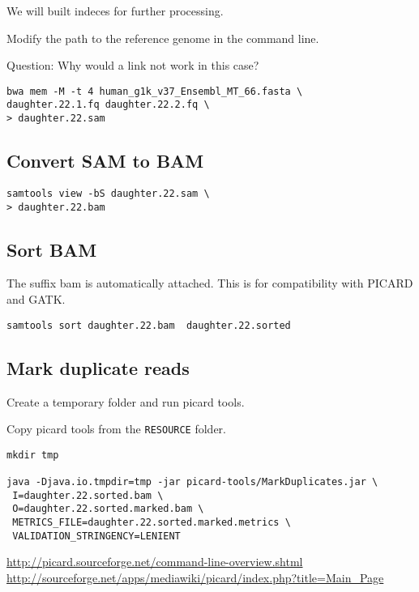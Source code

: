 \documentclass{article}
\begin{document}
We will built indeces for further processing.

Modify the path to the reference genome in the command line. 

Question: Why would a link not work in this case?

\begin{verbatim}
bwa mem -M -t 4 human_g1k_v37_Ensembl_MT_66.fasta \
daughter.22.1.fq daughter.22.2.fq \
> daughter.22.sam
\end{verbatim}

\subsection{Convert SAM to BAM}
\begin{verbatim}
samtools view -bS daughter.22.sam \
> daughter.22.bam
\end{verbatim}
\subsection{Sort BAM}
The suffix bam is automatically attached. This is for compatibility with PICARD and GATK.

\begin{verbatim}
samtools sort daughter.22.bam  daughter.22.sorted 
\end{verbatim}

\subsection{Mark duplicate reads}

Create a temporary folder and run picard tools.

Copy picard tools from the \verb+RESOURCE+ folder.
\begin{verbatim}
mkdir tmp

java -Djava.io.tmpdir=tmp -jar picard-tools/MarkDuplicates.jar \
 I=daughter.22.sorted.bam \
 O=daughter.22.sorted.marked.bam \
 METRICS_FILE=daughter.22.sorted.marked.metrics \
 VALIDATION_STRINGENCY=LENIENT

\end{verbatim}        
\url{http://picard.sourceforge.net/command-line-overview.shtml}
\url{http://sourceforge.net/apps/mediawiki/picard/index.php?title=Main_Page}
\end{document}
